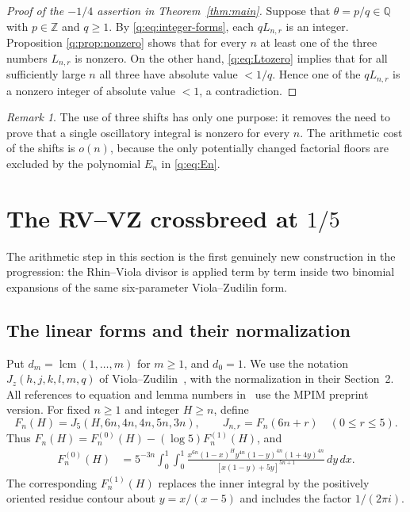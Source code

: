 \documentclass[11pt]{amsart}
\newcommand{\Z}{\mathbb Z}
\newcommand{\Q}{\mathbb Q}
\newcommand{\dd}{\,d}
\newcommand{\lcm}{\operatorname{lcm}}
\theoremstyle{plain}
\theoremstyle{remark}\newtheorem{remark}[theorem]{Remark}
\numberwithin{equation}{section}
\begin{document}
\begin{proof}[Proof of the $-1/4$ assertion in Theorem~\ref{thm:main}]
Suppose that $\theta=p/q\in\Q$ with $p\in\Z$ and $q\ge1$.  By
\eqref{q:eq:integer-forms}, each $qL_{n,r}$ is an integer.  Proposition
\ref{q:prop:nonzero} shows that for every $n$ at least one of the three numbers
$L_{n,r}$ is nonzero.  On the other hand, \eqref{q:eq:Ltozero} implies that for
all sufficiently large $n$ all three have absolute value $<1/q$.  Hence one
of the $qL_{n,r}$ is a nonzero integer of absolute value $<1$, a contradiction.
\end{proof}

\begin{remark}
The use of three shifts has only one purpose: it removes the need to prove
that a single oscillatory integral is nonzero for every $n$.  The arithmetic
cost of the shifts is $o(n)$, because the only potentially changed factorial
floors are excluded by the polynomial $E_n$ in \eqref{q:eq:En}.
\end{remark}


\section{The RV--VZ crossbreed at $1/5$}\label{sec:fifth}
The arithmetic step in this section is the first genuinely new construction in the progression: the Rhin--Viola divisor is applied term by term inside two binomial expansions of the same six-parameter Viola--Zudilin form.
\subsection{The linear forms and their normalization}\label{f:sec:construction}
Put $d_m=\lcm(1,\ldots,m)$ for $m\ge1$, and $d_0=1$.
We use the notation $J_z(h,j,k,l,m,q)$ of Viola--Zudilin~\cite{VZ18}, with the normalization in their Section~2. All references to equation and lemma numbers in~\cite{VZ18} use the MPIM preprint version. For fixed $n\geq1$ and integer $H\geq n$, define
\[
 F_n(H)=J_5(H,6n,4n,4n,5n,3n),\qquad
 J_{n,r}=F_n(6n+r)\quad(0\leq r\leq5).
\]
Thus $F_n(H)=F_n^{(0)}(H)-(\log5)F_n^{(1)}(H)$, and
\begin{align}\label{f:eq:real-original}
 F_n^{(0)}(H)
 &=5^{-3n}\int_0^1\!\int_0^1
 \frac{x^{6n}(1-x)^H y^{4n}(1-y)^{4n}(1+4y)^{4n}}
 {[x(1-y)+5y]^{5n+1}}\dd y\dd x.
\end{align}
The corresponding $F_n^{(1)}(H)$ replaces the inner integral by the positively oriented residue contour about $y=x/(x-5)$ and includes the factor $1/(2\pi i)$.
\end{document}
